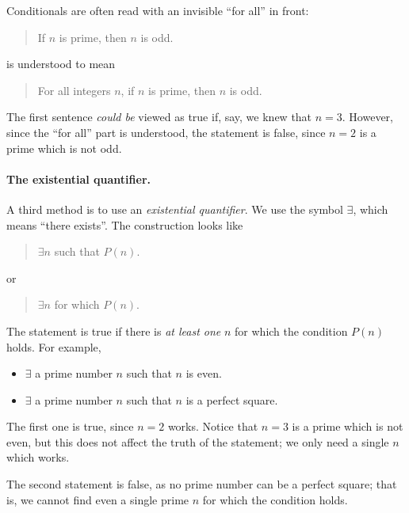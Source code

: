 \documentclass{tufte-book}
\begin{document}
Conditionals are often read with an invisible ``for all'' in front:
\begin{quote}
  If $n$ is prime, then $n$ is odd.
\end{quote}
is understood to mean
\begin{quote}
  For all integers $n$, if $n$ is prime, then $n$ is odd.
\end{quote}
The first sentence \emph{could be} viewed as true if, say, we knew that $n = 3$. However, since the ``for all'' part is understood, the statement is false, since $n = 2$ is a prime which is not odd. 


\paragraph{The existential quantifier.}
\label{sec:exist-quant}

A third method is to use an \emph{existential quantifier}. We use the symbol $\exists$, which means ``there exists''. The construction looks like
\begin{quote}
  $\exists n$ such that $P(n)$. 
\end{quote}
or
\begin{quote}
  $\exists n$ for which $P(n)$.
\end{quote}
The statement is true if there is \emph{at least one} $n$ for which the condition $P(n)$ holds. For example,
\begin{itemize}
    \item $\exists$ a prime number $n$ such that $n$ is even. 
    \item $\exists$ a prime number $n$ such that $n$ is a perfect square.
\end{itemize}
The first one is true, since $n = 2$ works. Notice that $n = 3$ is a prime which is not even, but this does not affect the truth of the statement; we only need a single $n$ which works.

The second statement is false, as no prime number can be a perfect square; that is, we cannot find even a single prime $n$ for which the condition holds.
\end{document}
